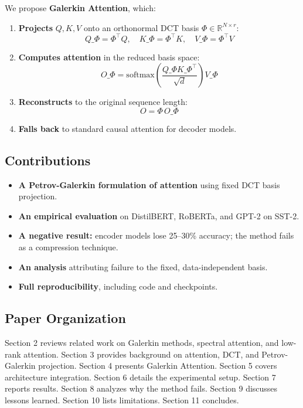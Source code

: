 We propose \textbf{Galerkin Attention}, which:

\begin{enumerate}
\item \textbf{Projects} $Q, K, V$ onto an orthonormal DCT basis $\Phi \in \mathbb{R}^{N \times r}$:
  $$
  Q\_\Phi = \Phi^\top Q, \quad K\_\Phi = \Phi^\top K, \quad V\_\Phi = \Phi^\top V
  $$

\item \textbf{Computes attention} in the reduced basis space:
  $$
  O\_\Phi = \mathrm{softmax}\!\left(\frac{Q\_\Phi K\_\Phi^\top}{\sqrt{d}}\right) V\_\Phi
  $$

\item \textbf{Reconstructs} to the original sequence length:
  $$
  O = \Phi \, O\_\Phi
  $$

\item \textbf{Falls back} to standard causal attention for decoder models.

\end{enumerate}
\subsection{Contributions}

\begin{itemize}
\item \textbf{A Petrov-Galerkin formulation of attention} using fixed DCT basis
  projection.
\item \textbf{An empirical evaluation} on DistilBERT, RoBERTa, and GPT-2 on SST-2.
\item \textbf{A negative result:} encoder models lose 25--30\% accuracy; the method
  fails as a compression technique.
\item \textbf{An analysis} attributing failure to the fixed, data-independent basis.
\item \textbf{Full reproducibility}, including code and checkpoints.

\end{itemize}
\subsection{Paper Organization}

Section 2 reviews related work on Galerkin methods, spectral attention, 
and low-rank attention. Section 3 provides background on attention, DCT, 
and Petrov-Galerkin projection. Section 4 presents Galerkin Attention. 
Section 5 covers architecture integration. Section 6 details the 
experimental setup. Section 7 reports results. Section 8 analyzes why the 
method fails. Section 9 discusses lessons learned. Section 10 lists 
limitations. Section 11 concludes.



